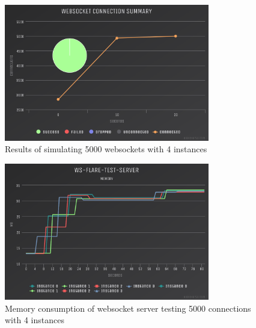 \begin{table}[H]
\caption{Cloud Foundry Resource Limits}
\label{table:cf-resource-limits-3}
\end{table}

\begin{figure}[H]
  \centering
    \includegraphics[width=0.8\textwidth]{figures/experiments/experiment-1/node-js/conn-summary-5000-4-instances.png}
    \caption{Results of simulating 5000 websockets with 4 instances}
    \label{fig:experiment-1-conn-summary-5000-4-instances}
\end{figure}

\begin{figure}[H]
  \centering
    \includegraphics[width=0.8\textwidth]{figures/experiments/experiment-1/node-js/memory-5000-4-instances.png}
    \caption{Memory consumption of websocket server testing 5000 connections with 4 instances}
    \label{fig:experiment-1-memory-5000-4-instances}
\end{figure}

